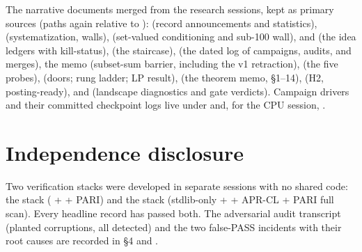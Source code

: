 The narrative documents merged from the research sessions, kept as
primary sources (paths again relative to ):
 (record announcements and statistics),
 (systematization, walls),
 (set-valued conditioning and sub-100 wall),
 and  (the idea ledgers with
kill-status),  (the staircase),
 (the dated log of campaigns, audits, and
merges), the memo 
(subset-sum barrier, including the v1 retraction),
 (the five probes),
 (doors; rung ladder; LP result),
 (the theorem memo, \S1--14),
 (H2, posting-ready), and
 (landscape diagnostics and gate verdicts).
Campaign drivers and their committed checkpoint logs live under
 and, for the CPU session,
.

\section{Independence disclosure}

Two verification stacks were developed in separate sessions with no
shared code: the  stack ( +
 + PARI) and the  stack
(stdlib-only  +  + APR-CL
+ PARI full scan). Every headline record has passed both. The
adversarial audit transcript (planted corruptions, all detected) and
the two false-PASS incidents with their root causes are recorded in
 \S4 and
.
